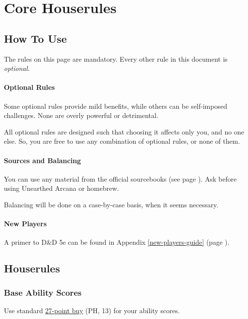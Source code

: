 \documentclass[letterpaper,twocolumn,openany,nodeprecatedcode,bg=print]{dndbook}
\newcommand{\pg}[1]{page \pageref{#1}}
\newcommand{\see}[1]{(see \pg{#1})}
\begin{document}




\chapter{Core Houserules}

\noindent [Version 7.6.1]

\section{How To Use}
The rules on this page are mandatory. 
Every other rule in this document is \textit{optional.} 

\subsubsection{Optional Rules}
Some optional rules provide mild benefits, while others can be self-imposed challenges. 
None are overly powerful or detrimental. 

All optional rules are designed such that choosing it affects only you, and no one else. 
So, you are free to use any combination of optional rules, or none of them.

\subsubsection{Sources and Balancing}
You can use any material from the official sourcebooks \see{sources}. 
Ask before using Unearthed Arcana or homebrew.

Balancing will be done on a case-by-case basis, when it seems necessary. 

\subsubsection{New Players}
A primer to D\&D 5e can be found in Appendix \ref{new-players-guide} (\pg{new-players-guide}).

\newpage
\section{Houserules}

\subsection{Base Ability Scores}
Use standard \href{https://chicken-dinner.com/5e/5e-point-buy.html}{27-point buy} (PH, 13) for your ability scores. 
\end{document}
